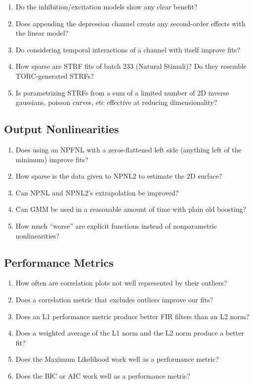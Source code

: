 \documentclass[11pt]{article}
\begin{document}
\begin{enumerate}
\item Do the inhibition/excitation models show any clear benefit?
\item Does appending the depression channel create any second-order effects with the linear model?
\item Do considering temporal interactions of a channel with itself improve fits?
\item How sparse are STRF fits of batch 233 (Natural Stimuli)? Do they resemble TORC-generated STRFs?
\item Is parametrizing STRFs from a sum of a limited number of 2D inverse gaussians, poisson curves, etc effective at reducing dimensionality?
\end{enumerate}
\subsection{Output Nonlinearities}
\label{sec-3.6}

\begin{enumerate}
\item Does using an NPFNL with a zeros-flattened left side (anything left of the minimum) improve fits?
\item How sparse is the data given to NPNL2 to estimate the 2D surface?
\item Can NPNL and NPNL2's extrapolation be improved?
\item Can GMM be used in a reasonable amount of time with plain old boosting?
\item How much ``worse'' are explicit functions instead of nonparametric nonlinearities?
\end{enumerate}
\subsection{Performance Metrics}
\label{sec-3.7}

\begin{enumerate}
\item How often are correlation plots not well represented by their outliers?
\item Does a correlation metric that excludes outliers improve our fits?
\item Does an L1 performance metric produce better FIR filters than an L2 norm?
\item Does a weighted average of the L1 norm and the L2 norm produce a better fit?
\item Does the Maximum Likelihood work well as a performance metric?
\item Does the BIC or AIC work well as a performance metric?
\end{enumerate}
\end{document}
